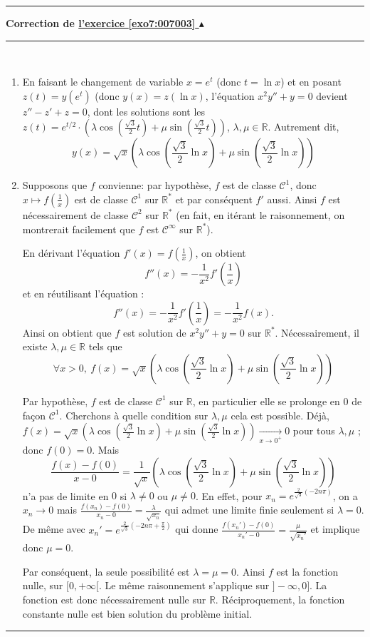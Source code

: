 \documentclass[11pt,a4paper]{article}
\newcommand{\Rr}{\mathbb{R}} \newcommand{\R}{\mathbb{R}}
\newcounter{exo}
\newcommand{\correction}[1]{\hypertarget{cor7:#1}{}\label{cor7:#1}{\bf Correction de \hyperlink{exo7:#1}{l'exercice \ref{exo7:#1} $\blacktriangle$}}\vspace{1mm}\hrule\vspace{1mm}}
\newcommand{\fincorrection}{\vspace{1mm}\hrule\vspace*{7mm}}
\begin{document}
\fincorrection
\correction{007003}
\ \begin{enumerate}
\item En faisant le changement de variable $x=e^t$ (donc $t = \ln x$) et en posant 
$z(t)=y(e^t)$ (donc $y(x) = z(\ln x)$, l'équation $x^2y''+y=0$ devient $z''-z'+z=0$, 
dont les solutions sont les 
$z(t)=e^{t/2}\cdot\left( \lambda\cos(\frac{\sqrt{3}}{2}t)+\mu\sin(\frac{\sqrt{3}}{2}t) \right)$,
$\lambda,\mu\in\Rr$. 
Autrement dit, 
$$y(x)=\sqrt{x}\left(\lambda\cos(\frac{\sqrt{3}}{2}\ln x)+\mu\sin(\frac{\sqrt{3}}{2}\ln x)\right)$$
\item Supposons que $f$ convienne: par hypothèse, $f$ est de classe $\mathcal{C}^1$, 
donc $x\mapsto f(\frac{1}{x})$ est de classe $\mathcal{C}^1$ sur $\R^*$ et 
par conséquent $f'$ aussi. Ainsi $f$ est nécessairement de classe 
$\mathcal{C}^2$ sur $\R^*$ (en fait, en itérant le raisonnement, on montrerait 
facilement que $f$ est $\mathcal{C}^\infty$ sur $\R^*$). 


En dérivant l'équation $f'(x)=f\left(\frac{1}{x}\right)$, 
on obtient 
$$f''(x)=-\frac{1}{x^2}f'\left(\frac{1}{x}\right)$$
et en réutilisant l'équation :
$$f''(x)=-\frac{1}{x^2}f'\left(\frac{1}{x}\right)= -\frac{1}{x^2} f(x).$$
Ainsi on obtient que $f$ est solution de $x^2y''+y=0$ sur $\R^*$. 
Nécessairement, il existe $\lambda,\mu\in\Rr$ tels que 
$$\forall x>0,\ f(x)=\sqrt{x}\left(\lambda\cos(\frac{\sqrt{3}}{2}\ln x)
+\mu\sin(\frac{\sqrt{3}}{2}\ln x)\right)$$


Par hypothèse, $f$ est de classe $\mathcal{C}^1$ sur $\R$, en particulier 
elle se prolonge en $0$ de façon $\mathcal{C}^1$. Cherchons à quelle condition 
sur $\lambda,\mu$ cela est possible. Déjà, 
$f(x)=\sqrt{x}\left(\lambda\cos(\frac{\sqrt{3}}{2}\ln x)+\mu\sin(\frac{\sqrt{3}}{2}\ln x)\right)
\xrightarrow[x\to 0^+]{}0$ pour tous $\lambda,\mu$ ; donc $f(0)=0$. Mais
$$\frac{f(x)-f(0)}{x-0}= \frac1{\sqrt{x}}
\left(\lambda\cos(\frac{\sqrt{3}}{2}\ln x)+\mu\sin(\frac{\sqrt{3}}{2}\ln x)\right)$$ 
n'a pas de limite en $0$ si $\lambda\neq0$ ou $\mu\neq0$. En effet, pour 
$x_n=e^{\frac{2}{\sqrt{3}}(-2n\pi)}$, on a $x_n\to 0$ 
mais $\frac{f(x_n)-f(0)}{x_n-0}=\frac{\lambda}{\sqrt{x_n}}$ qui admet une limite finie seulement si $\lambda = 0$.
De même avec $x_n'=e^{\frac{2}{\sqrt{3}}(-2n\pi+\frac\pi2)}$ qui donne
$\frac{f(x_n')-f(0)}{x_n'-0}=\frac{\mu}{\sqrt{x_n'}}$ et implique donc $\mu=0$.


Par conséquent, la seule possibilité est $\lambda=\mu=0$. Ainsi $f$ est la fonction nulle, sur $[0,+\infty[$.
Le même raisonnement s'applique sur $]-\infty,0]$. La fonction est donc nécessairement nulle sur $\Rr$.
Réciproquement, la fonction constante nulle est bien solution du problème initial. 
\end{enumerate}
\fincorrection
\end{document}
